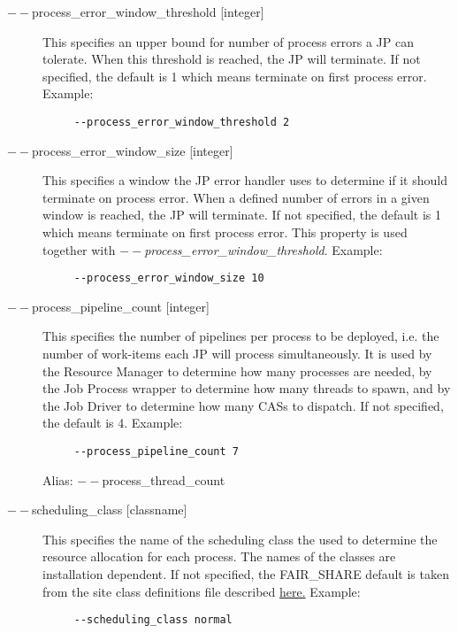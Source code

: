 \begin{description}
           \item[$--$process\_error\_window\_threshold {[integer]} ] This specifies an upper bound for number 
             of process errors a JP can tolerate. When this threshold is reached, the JP will terminate. If 
             not specified, the default is 1 which means terminate on first process error. Example:
             \begin{verbatim}
     --process_error_window_threshold 2
             \end{verbatim}  
             
           \item[$--$process\_error\_window\_size {[integer]} ] This specifies a window the JP error handler 
             uses to determine if it should terminate on process error. When a defined number of errors 
             in a given window is reached, the JP will terminate. If not specified, the default is 1 which means 
             terminate on first process error. This property is used together with {\em $--$process\_error\_window\_threshold}. Example:
             \begin{verbatim}
     --process_error_window_size 10
             \end{verbatim}   
             
           \item[$--$process\_pipeline\_count {[integer]} ] This specifies the number of pipelines per
             process to be deployed, i.e. the number of work-items each JP will process simultaneously. 
             It is used by the Resource Manager to determine how many
             processes are needed, by the Job Process wrapper to determine how many threads to
             spawn, and by the Job Driver to determine how many CASs to dispatch. If not specified,
             the default is 4. Example:
             \begin{verbatim}
     --process_pipeline_count 7
             \end{verbatim}
             Alias:  $--$process\_thread\_count
             
           \item[$--$scheduling\_class {[classname]} ] This specifies the name of the scheduling class
             the used to determine the resource allocation for each process. The names of the
             classes are installation dependent. 
             If not specified, the FAIR\_SHARE default is taken from the site class definitions file
             described \hyperref[subsubsec:class.configuration]{here.} 
             Example:
             \begin{verbatim}
     --scheduling_class normal
             \end{verbatim}


\end{description}
